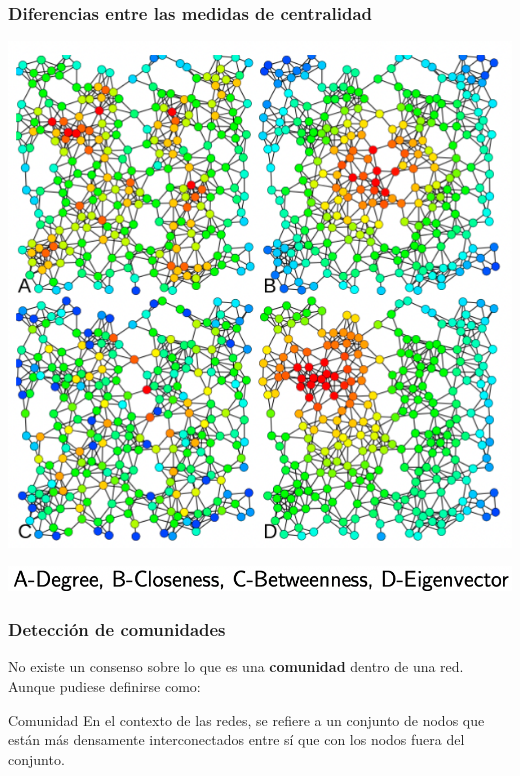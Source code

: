 \documentclass[
10pt, %
aspectratio=169, %
]{beamer}
\begin{document}
	\begin{frame}
		
		\frametitle{Diferencias entre las medidas de centralidad}
		
		\centering
		\includegraphics[scale=0.3]{ejemplo-centralidad.png}
		
		\includegraphics[scale=0.27]{ejemplo-centralidad-etiquetas.png}
		
	\end{frame}
	
	\begin{frame}
		
		\frametitle{Detección de comunidades}
		
		No existe un consenso sobre lo que es una \textbf{comunidad} dentro de una red. Aunque pudiese definirse como:
		
		
		\begin{alertblock}{Comunidad}
			En el contexto de las redes, se refiere a un conjunto de nodos que están más densamente interconectados entre sí que con los nodos fuera del conjunto.
		\end{alertblock}
		
		\only<2>{
			\vspace{3\baselineskip}
				\textcolor{purple}{¿Qué ideas pueden usarse para detectar comunidades dentro de una red?} 
				
		}
		
	\end{frame}
	
\end{document}
